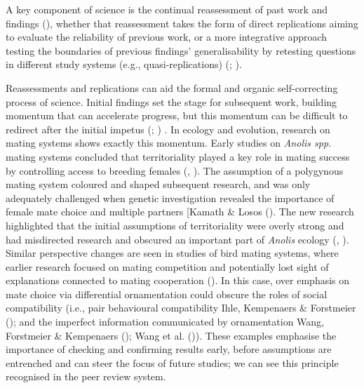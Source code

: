 \documentclass[10pt,a4paper]{article}
\begin{document}
A key component of science is the continual reassessment of past work and findings (), whether that reassessment takes the form of direct replications aiming to evaluate the reliability of previous work, or a more integrative approach testing the boundaries of previous findings' generalisability by retesting questions in different study systems (e.g., quasi-replications) (; ).

Reassessments and replications can aid the formal and organic self-correcting process of science.
Initial findings set the stage for subsequent work, building momentum that can accelerate progress, but this momentum can be difficult to redirect after the initial impetus (; ) .
In ecology and evolution, research on mating systems shows exactly this momentum.
Early studies on \emph{Anolis spp.} mating systems concluded that territoriality played a key role in mating success by controlling access to breeding females (, ).
The assumption of a polygynous mating system coloured and shaped subsequent research, and was only adequately challenged when genetic investigation revealed the importance of female mate choice and multiple partners {[}Kamath \& Losos ().
The new research highlighted that the initial assumptions of territoriality were overly strong and had misdirected research and obscured an important part of \emph{Anolis} ecology (, ).
Similar perspective changes are seen in studies of bird mating systems, where earlier research focused on mating competition and potentially lost sight of explanations connected to mating cooperation ().
In this case, over emphasis on mate choice via differential ornamentation could obscure the roles of social compatibility (i.e., pair behavioural compatibility Ihle, Kempenaers \& Forstmeier (); and the imperfect information communicated by ornamentation Wang, Forstmeier \& Kempenaers (); Wang et al. ()).
These examples emphasise the importance of checking and confirming results early, before assumptions are entrenched and can steer the focus of future studies; we can see this principle recognised in the peer review system.
\end{document}
